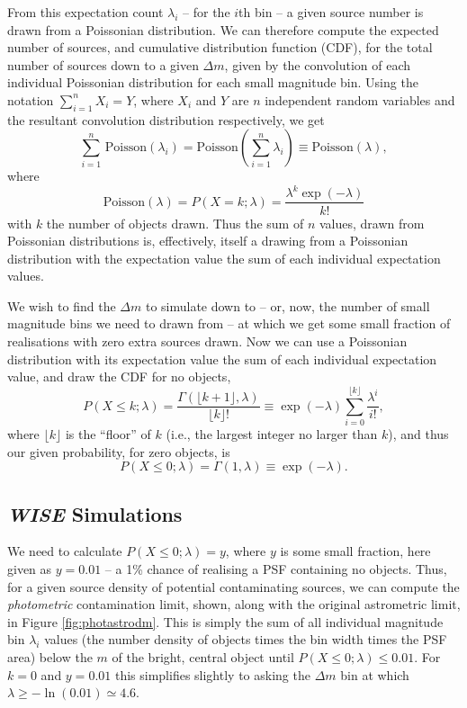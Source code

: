 \documentclass[fleqn,usenatbib]{mnras}
\begin{document}
From this expectation count $\lambda_i$ -- for the $i$th bin -- a given source number is drawn from a Poissonian distribution.
We can therefore compute the expected number of sources, and cumulative distribution function (CDF), for the total number of sources down to a given $\Delta m$, given by the convolution of each individual Poissonian distribution for each small magnitude bin.
Using the notation $\sum_{i=1}^n X_i = Y$, where $X_i$ and $Y$ are $n$ independent random variables and the resultant convolution distribution respectively, we get
\begin{equation}
    \sum\limits_{i=1}^n\,\mathrm{Poisson}(\lambda_i) = \mathrm{Poisson}\left(\sum\limits_{i=1}^n\lambda_i\right) \equiv \mathrm{Poisson}(\lambda),
\end{equation}
where
\begin{equation}
\mathrm{Poisson}(\lambda) = P(X = k; \lambda) = \frac{\lambda^k \exp(-\lambda)}{k!}
\end{equation}
with $k$ the number of objects drawn.
Thus the sum of $n$ values, drawn from Poissonian distributions is, effectively, itself a drawing from a Poissonian distribution with the expectation value the sum of each individual expectation values.

We wish to find the $\Delta m$ to simulate down to -- or, now, the number of small magnitude bins we need to drawn from -- at which we get some small fraction of realisations with zero extra sources drawn.
Now we can use a Poissonian distribution with its expectation value the sum of each individual expectation value, and draw the CDF for no objects,
\begin{equation}
    P(X \leq k; \lambda) = \frac{\Gamma(\lfloor k + 1 \rfloor, \lambda)}{\lfloor k \rfloor!} \equiv \exp(-\lambda) \sum_{i=0}^{\lfloor k \rfloor}\frac{\lambda^i}{i!},
\end{equation}
where $\lfloor k \rfloor$ is the ``floor'' of $k$ (i.e., the largest integer no larger than $k$), and thus our given probability, for zero objects, is
\begin{equation}
    P(X \leq 0; \lambda) = \Gamma(1, \lambda) \equiv \exp(-\lambda).
\end{equation}

\subsection{\textit{WISE} Simulations}
We need to calculate $P(X \leq 0; \lambda) = y$, where $y$ is some small fraction, here given as $y = 0.01$ -- a 1\% chance of realising a PSF containing no objects.
Thus, for a given source density of potential contaminating sources, we can compute the \textit{photometric} contamination limit, shown, along with the original astrometric limit, in Figure \ref{fig:photastrodm}.
This is simply the sum of all individual magnitude bin $\lambda_i$ values (the number density of objects times the bin width times the PSF area) below the $m$ of the bright, central object until $P(X \leq 0; \lambda) \leq 0.01$.
For $k = 0$ and $y = 0.01$ this simplifies slightly to asking the $\Delta m$ bin at which $\lambda \geq -\ln(0.01) \simeq 4.6$.
\end{document}
